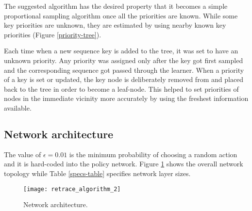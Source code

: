 \documentclass{article}
\begin{document}
The suggested algorithm has the desired property that it becomes a simple 
proportional sampling algorithm once all the priorities are known. While 
some key priorities are unknown, they are estimated by using nearby known 
key priorities (Figure \ref{priority-tree}).

Each time when a new sequence key is added to the tree, it was set to have an 
unknown priority. Any priority was assigned only after the key got first 
sampled and the corresponding sequence got passed through the learner. When a 
priority of a key is set or updated, the key node is deliberately removed from 
and placed back to the tree in order to become a leaf-node. This helped to 
set priorities of nodes in the immediate vicinity more accurately by using the 
freshest information available.


\subsection{Network architecture}
The value of 
$\epsilon=0.01$ is the minimum probability of choosing a random action and it 
is hard-coded into the policy network. Figure \ref{netarch} shows the overall 
network topology while Table \ref{specs-table} specifies network layer sizes.
\newpage
\begin{figure}[ht]
\centering
\texttt{[image: retrace\_algorithm\_2]}
  \caption{Network architecture.}
  \label{netarch}
\end{figure}
\end{document}
